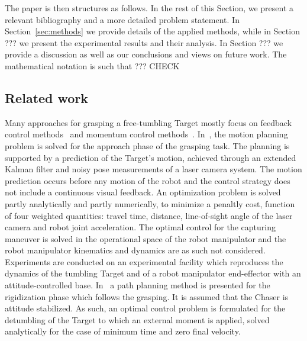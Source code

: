 The paper is then structures as follows. In the rest of this Section, we present a relevant bibliography and a more detailed problem statement. In Section~\ref{sec:methods} we provide details of the applied methods, while in Section ??? we present the experimental results and their analysis. In Section ??? we provide a discussion as well as our conclusions and views on future work. The mathematical notation is such that ??? CHECK
%
\subsection{Related work}
\label{sec:related_work}
%
Many approaches for grasping a free-tumbling Target mostly focus on feedback control methods~\cite{moosavian2007free}\cite{papadopoulos1994dynamics} \cite{dlr96736} and momentum control methods~\cite{yoshida2006capture}. In~\cite{aghili2012prediction}, the motion planning problem is solved for the approach phase of the grasping task. The planning is supported by a prediction of the Target's motion, achieved through an extended Kalman filter and noisy pose measurements of a laser camera system. The motion prediction occurs before any motion of the robot and the control strategy does not include a continuous visual feedback. An optimization problem is solved partly analytically and partly numerically, to minimize a penaltly cost, function of four weighted quantities: travel time, distance, line-of-sight angle of the laser camera and robot joint acceleration. The optimal control for the capturing maneuver is solved in the operational space of the robot manipulator and the robot manipulator kinematics and dynamics are as such not considered. Experiments are conducted on an experimental facility which reproduces the dynamics of the tumbling Target and of a robot manipulator end-effector with an attitude-controlled base. In~\cite{aghili2009optimal} a path planning method is presented for the rigidization phase which follows the grasping. It is assumed that the Chaser is attitude stabilized. As such, an optimal control problem is formulated for the detumbling of the Target to which an external moment is applied, solved analytically for the case of minimum time and zero final velocity.

